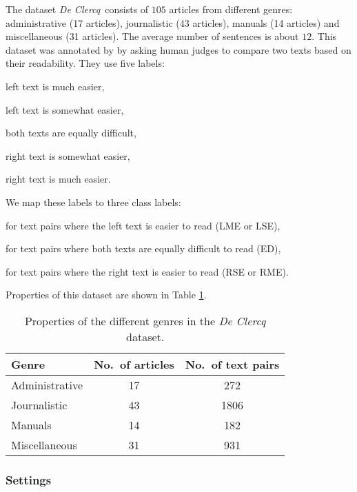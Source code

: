 The dataset \emph{De Clercq}\ consists of $105$ articles from different
genres: administrative (17 articles), journalistic (43 articles), manuals (14 articles) and miscellaneous (31 articles). The
average number of sentences is about $12$. This dataset was annotated
by  by asking human judges to compare two texts
based on their readability. They use five labels:
\squishlist
\item[\textbf{LME:}] left text is much easier,
\item[\textbf{LSE:}] left text is somewhat easier, 
\item[\textbf{ED:}] both texts are equally difficult,
\item[\textbf{RSE:}] right text is somewhat easier,
\item[\textbf{RME:}] right text is much easier.
\squishend

We map these labels to three class labels:

\squishlist
\item[\textbf{$+1$:}] for text pairs where the left text is easier to read
  (LME or LSE),
\item[\textbf{$0$:}] for text pairs where both texts are equally
  difficult to read (ED), 
\item[\textbf{$-1$:}] for text pairs where the right text is easier to read (RSE or RME).
\squishend

Properties of this dataset are shown in Table \ref{table:genre_prop}.

\begin{table}[!h]
\centering
\begin{tabular}{lcc}
\hline
Genre & No.\ of articles & No.\ of text pairs \\\hline
Administrative & 17 & 272 \\
Journalistic & 43 & 1806 \\
Manuals & 14 & 182 \\
Miscellaneous & 31 & 931\\\hline
\end{tabular}
\caption{Properties of the different genres in the \emph{De Clercq} dataset.}
\label{table:genre_prop}
\end{table}

\subsubsection{Settings}
